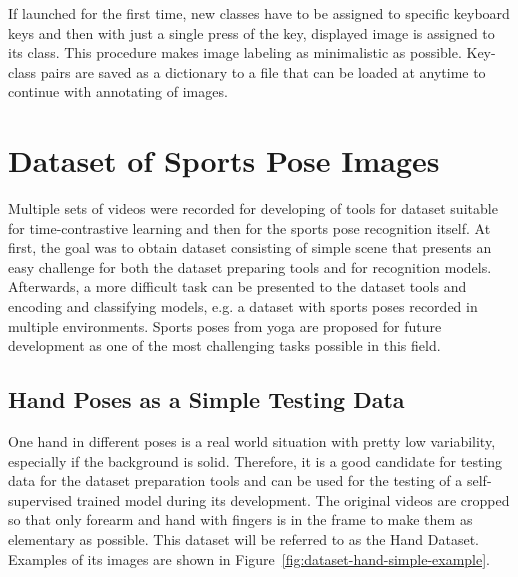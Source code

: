 If launched for the first time, new classes have to be assigned to specific keyboard keys and then with just a single press of the key, displayed image is assigned to its class. This procedure makes image labeling as minimalistic as possible. Key-class pairs are saved as a dictionary to a file that can be loaded at anytime to continue with annotating of images.

\section{\label{sec:dataset-sports-poses}Dataset of Sports Pose Images}

Multiple sets of videos were recorded for developing of tools for dataset suitable for time-contrastive learning and then for the sports pose recognition itself. At first, the goal was to obtain dataset consisting of simple scene that presents an easy challenge for both the dataset preparing tools and for recognition models. Afterwards, a more difficult task can be presented to the dataset tools and encoding and classifying models, e.g. a dataset with sports poses recorded in multiple environments. Sports poses from yoga are proposed for future development as one of the most challenging tasks possible in this field.

\subsection{\label{sec:dataset-hand}Hand Poses as a Simple Testing Data}

One hand in different poses is a real world situation with pretty low variability, especially if the background is solid. Therefore, it is a good candidate for testing data for the dataset preparation tools and can be used for the testing of a self-supervised trained model during its development. The original videos are cropped so that only forearm and hand with fingers is in the frame to make them as elementary as possible. This dataset will be referred to as the Hand Dataset. Examples of its images are shown in Figure~\ref{fig:dataset-hand-simple-example}.

